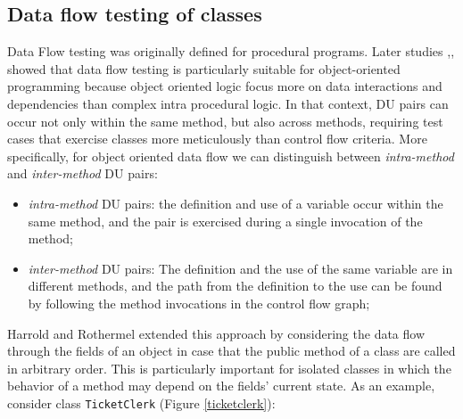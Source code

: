 \subsection{Data flow testing of classes}
Data Flow testing was originally defined for procedural programs. Later studies \cite{Buy},\cite{Harrold},\cite{Pezze2008} showed that data flow testing is particularly suitable for object-oriented programming because object oriented logic focus more on data interactions and dependencies than complex intra procedural logic. In that context, DU pairs can occur not only within the same method, but also across methods, requiring test cases that exercise classes more meticulously than control flow criteria. More specifically, for object oriented data flow we can distinguish between \textit{intra-method} and \textit{inter-method} DU pairs:

 \begin{itemize}
   \item \textit{intra-method} DU pairs: the definition and use of a variable occur within the same method, and
   the pair is exercised during a single invocation of the method;
   \item \textit{inter-method} DU pairs: The definition and the use of the same variable are in different methods,
    and the path from the definition to the use can be found by following the method invocations in the control
    flow graph;
 \end{itemize}

Harrold and Rothermel \cite{Harrold} extended this approach by considering the data flow through the fields of an object in case that the public method of a class are called in arbitrary order. This is particularly important for isolated classes in which the behavior of a method may depend on the fields' current state. As an example, consider class \texttt{TicketClerk} (Figure \ref{ticketclerk}):

